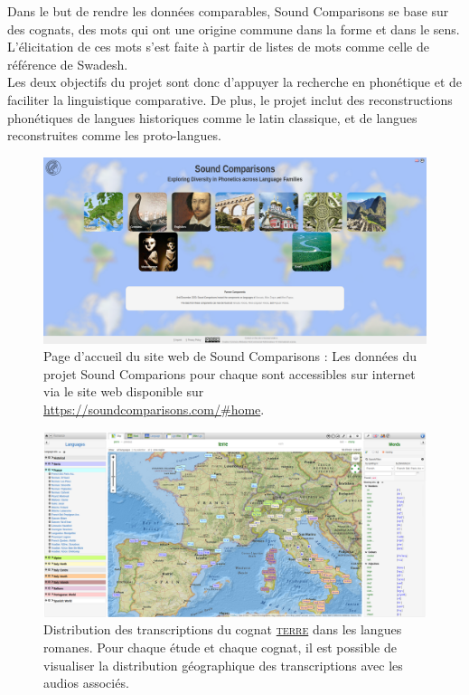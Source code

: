 Dans le but de rendre les données comparables, Sound Comparisons se base sur des cognats, des mots qui ont une origine commune dans la forme et dans le sens. L'élicitation de ces mots s'est faite à partir de listes de mots comme celle de référence de Swadesh.\\

Les deux objectifs du projet sont donc d'appuyer la recherche en phonétique et de faciliter la linguistique comparative.
De plus, le projet inclut des reconstructions phonétiques de langues historiques comme le latin classique, et de langues reconstruites comme les proto-langues.\\

\begin{figure}
	\centering
	\includegraphics[width=1\linewidth]{substance/images/soundcompa1}
	\caption[Page d'accueil du site web de Sound Comparisons]{Page d'accueil du site web de Sound Comparisons : Les données du projet Sound Comparions pour chaque  sont accessibles sur internet via le site web disponible sur \url{https://soundcomparisons.com/\#home}.}
	\label{fig:soundcompa1}
\end{figure}

\begin{figure}
	\centering
	\includegraphics[width=1\linewidth]{substance/images/soundcompa2}
	\caption[Distribution des transcriptions du cognat \textsc{terre} dans les langues romanes]{Distribution des transcriptions du cognat \href{https://soundcomparisons.com/\#/en/Romance/map/earth/Lgs_Sln}{\textsc{terre}} dans les langues romanes. Pour chaque étude et chaque cognat, il est possible de visualiser la distribution géographique des transcriptions avec les audios associés.}
	\label{fig:soundcompa2}
\end{figure}

